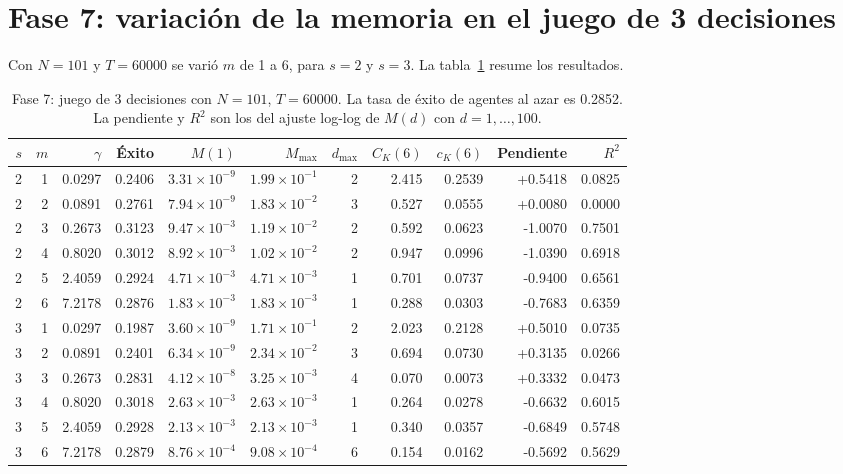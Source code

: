\documentclass[11pt,letterpaper]{article}
\begin{document}
\section{Fase 7: variación de la memoria en el juego de 3 decisiones}
Con $N=101$ y $T=60000$ se varió $m$ de 1 a 6, para $s=2$ y $s=3$. La tabla~\ref{tab:f7} resume los resultados.

\begin{table}[H]
\centering
\footnotesize
\setlength{\tabcolsep}{3.5pt}
\caption{Fase 7: juego de 3 decisiones con $N=101$, $T=60000$. La tasa de éxito de agentes al azar es 0.2852. La pendiente y $R^2$ son los del ajuste log-log de $M(d)$ con $d=1,\dots,100$.}\label{tab:f7}
\begin{tabular}{rrrrrrrrrrr}
\toprule
$s$ & $m$ & $\gamma$ & Éxito & $M(1)$ & $M_{\max}$ & $d_{\max}$ & $C_K(6)$ & $c_K(6)$ & Pendiente & $R^2$ \\
\midrule
2 & 1 & 0.0297 & 0.2406 & $3.31\times10^{-9}$ & $1.99\times10^{-1}$ & 2 & 2.415 & 0.2539 & +0.5418 & 0.0825 \\
2 & 2 & 0.0891 & 0.2761 & $7.94\times10^{-9}$ & $1.83\times10^{-2}$ & 3 & 0.527 & 0.0555 & +0.0080 & 0.0000 \\
2 & 3 & 0.2673 & 0.3123 & $9.47\times10^{-3}$ & $1.19\times10^{-2}$ & 2 & 0.592 & 0.0623 & -1.0070 & 0.7501 \\
2 & 4 & 0.8020 & 0.3012 & $8.92\times10^{-3}$ & $1.02\times10^{-2}$ & 2 & 0.947 & 0.0996 & -1.0390 & 0.6918 \\
2 & 5 & 2.4059 & 0.2924 & $4.71\times10^{-3}$ & $4.71\times10^{-3}$ & 1 & 0.701 & 0.0737 & -0.9400 & 0.6561 \\
2 & 6 & 7.2178 & 0.2876 & $1.83\times10^{-3}$ & $1.83\times10^{-3}$ & 1 & 0.288 & 0.0303 & -0.7683 & 0.6359 \\
3 & 1 & 0.0297 & 0.1987 & $3.60\times10^{-9}$ & $1.71\times10^{-1}$ & 2 & 2.023 & 0.2128 & +0.5010 & 0.0735 \\
3 & 2 & 0.0891 & 0.2401 & $6.34\times10^{-9}$ & $2.34\times10^{-2}$ & 3 & 0.694 & 0.0730 & +0.3135 & 0.0266 \\
3 & 3 & 0.2673 & 0.2831 & $4.12\times10^{-8}$ & $3.25\times10^{-3}$ & 4 & 0.070 & 0.0073 & +0.3332 & 0.0473 \\
3 & 4 & 0.8020 & 0.3018 & $2.63\times10^{-3}$ & $2.63\times10^{-3}$ & 1 & 0.264 & 0.0278 & -0.6632 & 0.6015 \\
3 & 5 & 2.4059 & 0.2928 & $2.13\times10^{-3}$ & $2.13\times10^{-3}$ & 1 & 0.340 & 0.0357 & -0.6849 & 0.5748 \\
3 & 6 & 7.2178 & 0.2879 & $8.76\times10^{-4}$ & $9.08\times10^{-4}$ & 6 & 0.154 & 0.0162 & -0.5692 & 0.5629 \\
\bottomrule
\end{tabular}
\end{table}
\end{document}
